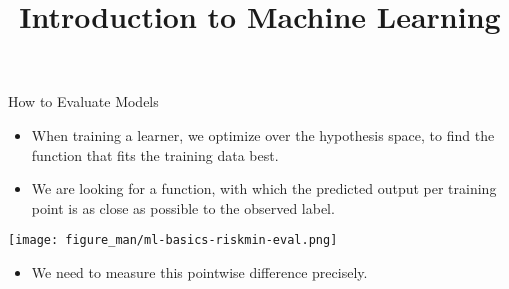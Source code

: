 \documentclass[11pt,compress,t,notes=noshow, xcolor=table]{beamer}
\title{Introduction to Machine Learning}
\begin{document}


\begin{vbframe}{How to Evaluate Models}

\begin{itemize}
\item When training a learner, we optimize over the hypothesis space,
    to find the function that fits the training data best.
\item We are looking for a function, with which the 
    predicted output per training point is as close as possible to
    the observed label.
\end{itemize}

\lz




\begin{center}\texttt{[image: figure\_man/ml-basics-riskmin-eval.png]} \end{center}

\lz


\begin{itemize}
    \item We need to measure this pointwise difference precisely.
  \end{itemize}
  
\end{vbframe}
\end{document}
